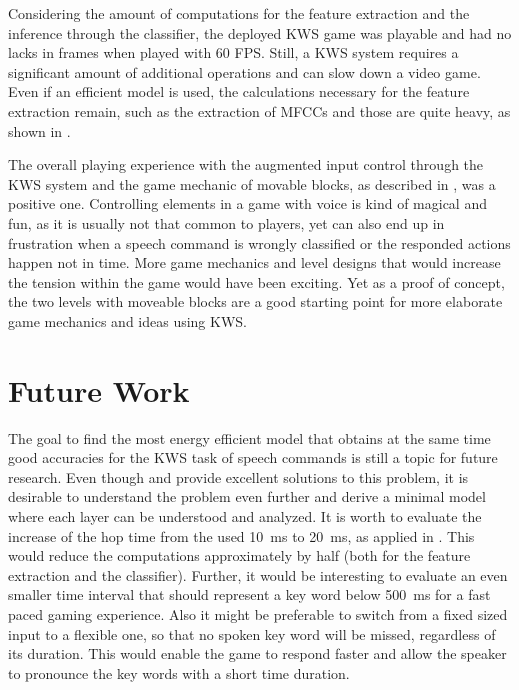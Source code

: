 Considering the amount of computations for the feature extraction and the inference through the classifier, the deployed KWS game was playable and had no lacks in frames when played with 60 FPS.
Still, a KWS system requires a significant amount of additional operations and can slow down a video game.
Even if an efficient model is used, the calculations necessary for the feature extraction remain, such as the extraction of MFCCs and those are quite heavy, as shown in .

The overall playing experience with the augmented input control through the KWS system and the game mechanic of movable blocks, as described in , was a positive one.
Controlling elements in a game with voice is kind of magical and fun, as it is usually not that common to players, yet can also end up in frustration when a speech command is wrongly classified or the responded actions happen not in time.
More game mechanics and level designs that would increase the tension within the game would have been exciting.
Yet as a proof of concept, the two levels with moveable blocks are a good starting point for more elaborate game mechanics and ideas using KWS.



\section{Future Work}
The goal to find the most energy efficient model that obtains at the same time good accuracies for the KWS task of speech commands is still a topic for future research.
Even though \cite{Zhang2017} and \cite{Peter2020} provide excellent solutions to this problem, it is desirable to understand the problem even further and derive a minimal model where each layer can be understood and analyzed.
It is worth to evaluate the increase of the hop time from the used \SI{10}{\milli\second} to \SI{20}{\milli\second}, as applied in \cite{Peter2020}.
This would reduce the computations approximately by half (both for the feature extraction and the classifier).
Further, it would be interesting to evaluate an even smaller time interval that should represent a key word below \SI{500}{\milli\second} for a fast paced gaming experience.
Also it might be preferable to switch from a fixed sized input to a flexible one, so that no spoken key word will be missed, regardless of its duration.
This would enable the game to respond faster and allow the speaker to pronounce the key words with a short time duration.

